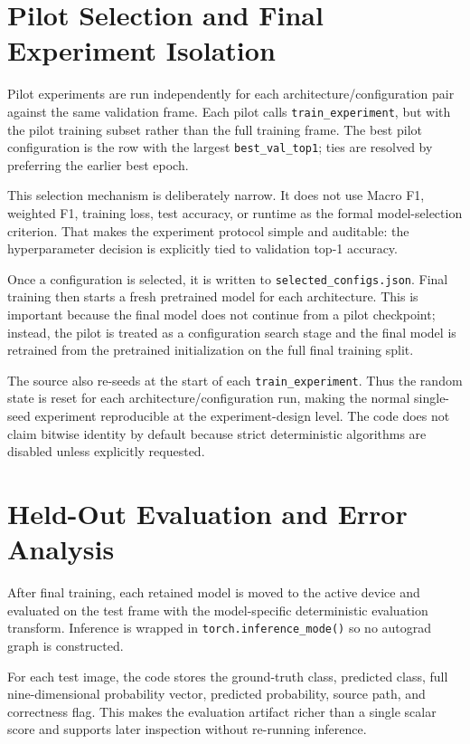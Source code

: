 \documentclass[11pt,a4paper]{article}
\begin{document}
\section{Pilot Selection and Final Experiment Isolation}
Pilot experiments are run independently for each architecture/configuration pair against the same validation frame. Each pilot calls \texttt{train\_experiment}, but with the pilot training subset rather than the full training frame. The best pilot configuration is the row with the largest \texttt{best\_val\_top1}; ties are resolved by preferring the earlier best epoch.

This selection mechanism is deliberately narrow. It does not use Macro F1, weighted F1, training loss, test accuracy, or runtime as the formal model-selection criterion. That makes the experiment protocol simple and auditable: the hyperparameter decision is explicitly tied to validation top-1 accuracy.

Once a configuration is selected, it is written to \texttt{selected\_configs.json}. Final training then starts a fresh pretrained model for each architecture. This is important because the final model does not continue from a pilot checkpoint; instead, the pilot is treated as a configuration search stage and the final model is retrained from the pretrained initialization on the full final training split.

The source also re-seeds at the start of each \texttt{train\_experiment}. Thus the random state is reset for each architecture/configuration run, making the normal single-seed experiment reproducible at the experiment-design level. The code does not claim bitwise identity by default because strict deterministic algorithms are disabled unless explicitly requested.

\section{Held-Out Evaluation and Error Analysis}
After final training, each retained model is moved to the active device and evaluated on the test frame with the model-specific deterministic evaluation transform. Inference is wrapped in \texttt{torch.inference\_mode()} so no autograd graph is constructed.

For each test image, the code stores the ground-truth class, predicted class, full nine-dimensional probability vector, predicted probability, source path, and correctness flag. This makes the evaluation artifact richer than a single scalar score and supports later inspection without re-running inference.
\end{document}
